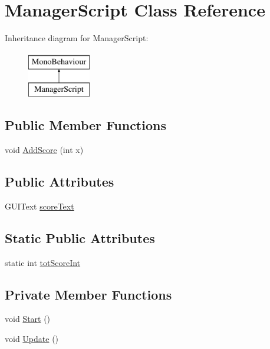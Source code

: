 \hypertarget{class_manager_script}{\section{Manager\-Script Class Reference}
\label{class_manager_script}
}
Inheritance diagram for Manager\-Script\-:\begin{figure}[H]
\begin{center}
\leavevmode
\includegraphics[height=2.000000cm]{class_manager_script}
\end{center}
\end{figure}
\subsection*{Public Member Functions}
\begin{DoxyCompactItemize}
\item 
void \hyperlink{class_manager_script_a2f85a1f7589c7bf006be8d7a8370c2a3}{Add\-Score} (int x)
\end{DoxyCompactItemize}
\subsection*{Public Attributes}
\begin{DoxyCompactItemize}
\item 
G\-U\-I\-Text \hyperlink{class_manager_script_acdf95cfdbeb28ea1871de6628fe8eb4f}{score\-Text}
\end{DoxyCompactItemize}
\subsection*{Static Public Attributes}
\begin{DoxyCompactItemize}
\item 
static int \hyperlink{class_manager_script_ae9249ae6a5eee7a36ea33345020f3ea6}{tot\-Score\-Int}
\end{DoxyCompactItemize}
\subsection*{Private Member Functions}
\begin{DoxyCompactItemize}
\item 
void \hyperlink{class_manager_script_a70c096ffb8ab7c8a8bab73bee1992869}{Start} ()
\item 
void \hyperlink{class_manager_script_ab58182b7b824eedad9f8e57f141e7236}{Update} ()
\end{DoxyCompactItemize}
